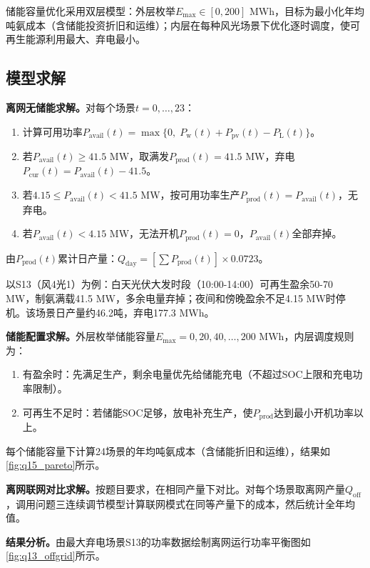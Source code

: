 储能容量优化采用双层模型：外层枚举$E_{\mathrm{max}} \in [0, 200]$ MWh，目标为最小化年均吨氨成本（含储能投资折旧和运维）；内层在每种风光场景下优化逐时调度，使可再生能源利用最大、弃电最小。

\subsection{模型求解}

\textbf{离网无储能求解。}对每个场景$t=0,\ldots,23$：
\begin{enumerate}
    \item 计算可用功率$P_{\mathrm{avail}}(t) = \max\{0,\; P_{\mathrm{w}}(t)+P_{\mathrm{pv}}(t)-P_{\mathrm{L}}(t)\}$。
    \item 若$P_{\mathrm{avail}}(t) \ge 41.5$ MW，取满发$P_{\mathrm{prod}}(t)=41.5$ MW，弃电$P_{\mathrm{cur}}(t)=P_{\mathrm{avail}}(t)-41.5$。
    \item 若$4.15 \le P_{\mathrm{avail}}(t) < 41.5$ MW，按可用功率生产$P_{\mathrm{prod}}(t)=P_{\mathrm{avail}}(t)$，无弃电。
    \item 若$P_{\mathrm{avail}}(t) < 4.15$ MW，无法开机$P_{\mathrm{prod}}(t)=0$，$P_{\mathrm{avail}}(t)$全部弃掉。
\end{enumerate}
由$P_{\mathrm{prod}}(t)$累计日产量：$Q_{\mathrm{day}} = [\sum P_{\mathrm{prod}}(t)] \times 0.0723$。

以S13（风4光1）为例：白天光伏大发时段（10:00-14:00）可再生盈余50-70 MW，制氨满载41.5 MW，多余电量弃掉；夜间和傍晚盈余不足4.15 MW时停机。该场景日产量约46.2吨，弃电177.3 MWh。

\textbf{储能配置求解。}外层枚举储能容量$E_{\mathrm{max}} = 0,20,40,\ldots,200$ MWh，内层调度规则为：
\begin{enumerate}
    \item 有盈余时：先满足生产，剩余电量优先给储能充电（不超过SOC上限和充电功率限制）。
    \item 可再生不足时：若储能SOC足够，放电补充生产，使$P_{\mathrm{prod}}$达到最小开机功率以上。
\end{enumerate}
每个储能容量下计算24场景的年均吨氨成本（含储能折旧和运维），结果如\cref{fig:q15_pareto}所示。

\textbf{离网联网对比求解。}按题目要求，在相同产量下对比。对每个场景取离网产量$Q_{\mathrm{off}}$，调用问题三连续调节模型计算联网模式在同等产量下的成本，然后统计全年均值。

\textbf{结果分析。}由最大弃电场景S13的功率数据绘制离网运行功率平衡图如\cref{fig:q13_offgrid}所示。


